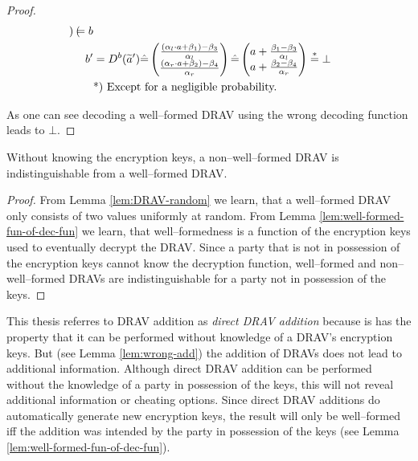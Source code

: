 \begin{proof}
\begin{align*}
\begin{pmatrix}
    \end{pmatrix}
    = b\\
    b' &= D^b(\widetilde{a}')
    \hat{=}
    \begin{pmatrix}
      \frac{(\alpha_l \cdot a + \beta_1) - \beta_3}{\alpha_l}\\
      \frac{(\alpha_r \cdot a + \beta_2) - \beta_4}{\alpha_r}\\
    \end{pmatrix}
    \hat{=}
    \begin{pmatrix}
      a +
      \frac{\beta_1 - \beta_3}{\alpha_l}\\
      a +
      \frac{\beta_2 - \beta_4}{\alpha_r}\\
    \end{pmatrix}
    \stackrel{*}{=} \bot\\
    &\text{*) Except for a negligible probability.}{}
  \end{align*}

  \noindent{}As one can see decoding a well--formed DRAV using the wrong
  decoding function leads to $\bot$.

\end{proof}


\begin{lem}
  \label{lem:DRAV-indistinguishable}

  Without knowing the encryption keys, a non--well--formed DRAV is
  indistinguishable from a well--formed DRAV.

\end{lem}
\begin{proof}

  From Lemma \ref{lem:DRAV-random} we learn, that a well--formed DRAV only
  consists of two values uniformly at random. From Lemma
  \ref{lem:well-formed-fun-of-dec-fun} we learn, that well--formedness is a
  function of the encryption keys used to eventually decrypt the DRAV. Since a
  party that is not in possession of the encryption keys cannot know the
  decryption function, well--formed and non--well--formed DRAVs are
  indistinguishable for a party not in possession of the keys.
\end{proof}


\label{sec:DRAV-addition}

This thesis referres to DRAV addition as \emph{direct DRAV addition} because is
has the property that it can be performed without knowledge of a DRAV's
encryption keys. But (see Lemma \ref{lem:wrong-add}) the addition of DRAVs does
not lead to additional information. Although direct DRAV addition can be
performed without the knowledge of a party in possession of the keys, this will
not reveal additional information or cheating options. Since direct DRAV
additions do automatically generate new encryption keys, the result will only be
well--formed iff the addition was intended by the party in possession of the
keys (see Lemma \ref{lem:well-formed-fun-of-dec-fun}).

